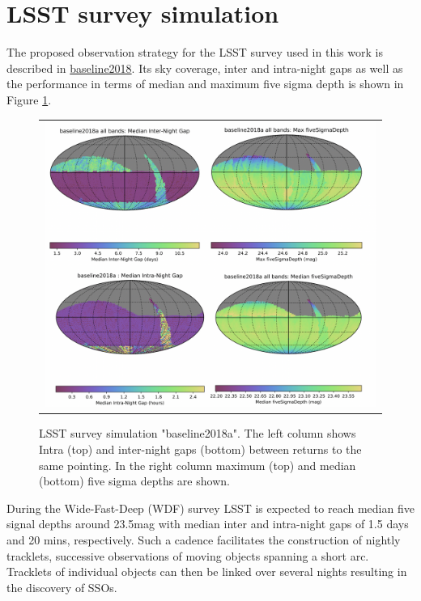 \section{LSST survey simulation} \label{sec:lsstss}
The proposed observation strategy for the LSST survey used in this work is described in \href{http://astro-lsst-01.astro.washington.edu:8080/multiColor?runId=1#Fivesigmadepth}{baseline2018}. Its sky coverage, inter and intra-night gaps as well as the performance in terms of median and maximum five sigma depth is shown in Figure \ref{fig:gaps}. 

\begin{figure}[tb!]
\begin{tabular}{c}
\includegraphics[width=1\linewidth]{figs/baseline2018a.png}
\end{tabular}
\caption{LSST survey simulation "baseline2018a". The left column shows Intra (top) and inter-night gaps (bottom) between returns to the same pointing. In the right column maximum (top) and median (bottom) five sigma depths are shown.}
\label{fig:gaps}       %
\end{figure}
%
During the Wide-Fast-Deep (WDF) survey LSST is expected to reach median five signal depths around 23.5mag with median inter and intra-night gaps of 1.5 days and 20 mins, respectively. Such a cadence facilitates the construction of nightly tracklets, successive observations of
moving objects spanning a short arc. Tracklets of individual objects can then be linked over several nights resulting in the discovery of SSOs.
